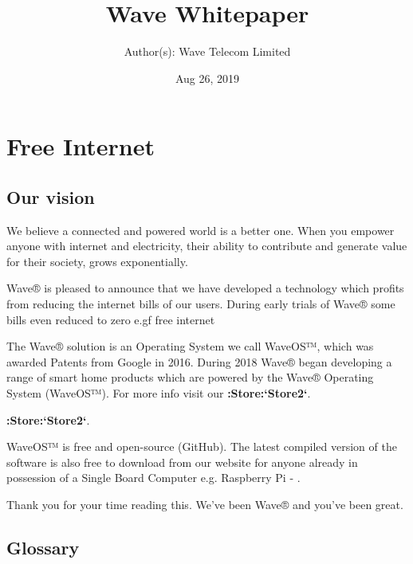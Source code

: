 \documentclass[letterpaper,10pt,openany,oneside,english]{sphinxmanual}
\title{Wave Whitepaper}
\date{Aug 26, 2019}
\author{Author(s): Wave Telecom Limited}
\begin{document}
\maketitle
\sphinxtableofcontents
{}\label{\detokenize{index::doc}}



\chapter{Free Internet}
\label{\detokenize{index:free-internet}}


\section{Our vision}
\label{\detokenize{index:our-vision}}
We believe a connected and powered world is a better one. When you empower anyone with internet and electricity, their ability to contribute and generate value for their society, grows exponentially.

Wave® is pleased to announce that we have developed a technology which profits from reducing the internet bills of our users. During early trials of Wave® some bills even reduced to zero e.gf free internet

The Wave® solution is an Operating System we call WaveOS™, which was awarded Patents from Google in 2016. During 2018 Wave® began developing a range of smart home products which are powered by the Wave® Operating System (WaveOS™). For more info visit our {\color{red}\bfseries{}:Store:{}`Store2{}`}.

{\color{red}\bfseries{}:Store:{}`Store2{}`}.

WaveOS™ is free and open-source (GitHub). The latest compiled version of the software is also free to download from our website for anyone already in possession of a Single Board Computer e.g. Raspberry Pi - .

Thank you for your time reading this.
We’ve been Wave® and you’ve been great.


\section{Glossary}
\label{\detokenize{index:glossary}}
\end{document}
